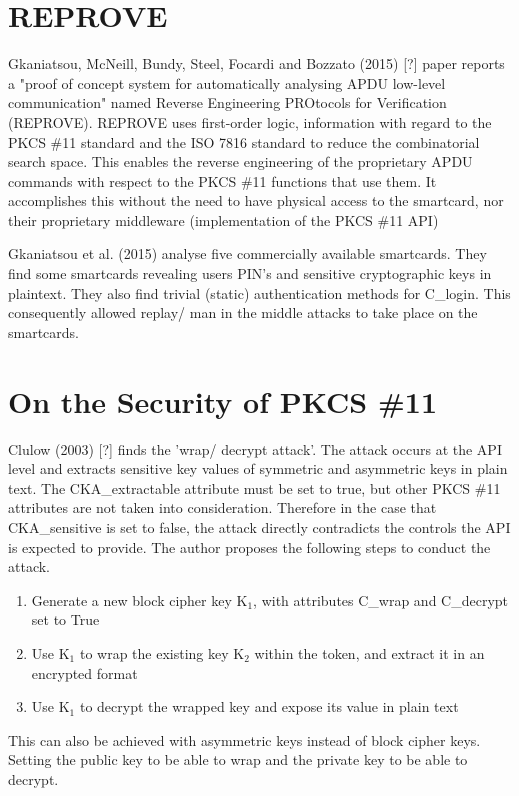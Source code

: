 \documentclass[bsc,frontabs,twoside,singlespacing,parskip,deptreport]{infthesis}     %
\begin{document}
\section{REPROVE}

Gkaniatsou, McNeill, Bundy, Steel, Focardi and Bozzato (2015) [?] paper reports a "proof of concept system for automatically analysing APDU low-level communication" named Reverse Engineering PROtocols for Verification (REPROVE). REPROVE uses first-order logic, information with regard to the PKCS \#11 standard and the ISO 7816 standard to reduce the combinatorial search space. This enables the reverse engineering of the proprietary APDU commands with respect to the PKCS \#11 functions that use them. It accomplishes this without the need to have physical access to the smartcard, nor their proprietary middleware (implementation of the PKCS \#11 API)

Gkaniatsou et al. (2015) analyse five commercially available smartcards. They find some smartcards revealing users PIN's and sensitive cryptographic keys in plaintext. They also find trivial (static) authentication methods for C\_login. This consequently allowed replay/ man in the middle attacks to take place on the smartcards.


\section{On the Security of PKCS \#11}

Clulow (2003) [?] finds the 'wrap/ decrypt attack'. The attack occurs at the API level and extracts sensitive key values of symmetric and asymmetric keys in plain text. The CKA\_extractable attribute must be set to true, but other PKCS \#11 attributes are not taken into consideration. Therefore in the case that CKA\_sensitive is set to false, the attack directly contradicts the controls the API is expected to provide. The author proposes the following steps to conduct the attack.
\begin{enumerate}
\item Generate a new block cipher key K$_1$, with attributes C\_wrap and C\_decrypt set to True
\item Use K$_1$ to wrap the existing key K$_2$ within the token, and extract it in an encrypted format
\item Use K$_1$ to decrypt the wrapped key and expose its value in plain text
\end{enumerate}

This can also be achieved with asymmetric keys instead of block cipher keys. Setting the public key to be able to wrap and the private key to be able to decrypt.
\end{document}
